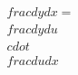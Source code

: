 \documentclass[preview]{standalone}
\begin{document}
\begin{align*}
\quad\\frac{dy}{dx} = \quad\\frac{dy}{du} \quad\\cdot \quad\\frac{du}{dx}
\end{align*}
\end{document}

